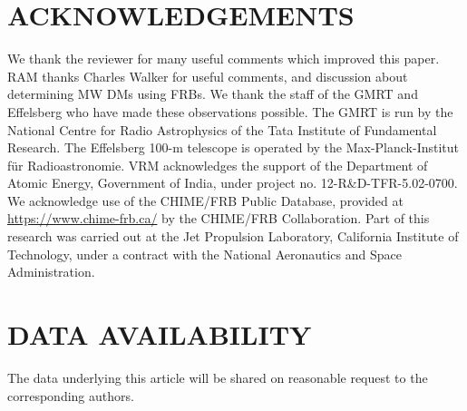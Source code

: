 \documentclass[fleqn,usenatbib]{mnras}
\begin{document}
\section{ACKNOWLEDGEMENTS}
We thank the reviewer for many useful comments which improved this paper. 
RAM thanks Charles Walker for useful comments, and discussion about determining MW DMs using FRBs.  We thank the staff of the GMRT and Effelsberg who have made these observations possible. The GMRT is run by the National Centre for Radio Astrophysics of the Tata Institute of Fundamental Research.  The Effelsberg 100-m telescope is operated by the Max-Planck-Institut f{\"u}r Radioastronomie.  VRM acknowledges the support of the Department of Atomic Energy, Government of India, under project no. 12-R\&D-TFR-5.02-0700. We acknowledge use of the CHIME/FRB Public Database, provided at \url{https://www.chime-frb.ca/} by the CHIME/FRB Collaboration. 
Part of this research was carried out at the Jet Propulsion Laboratory, California Institute of Technology, under a contract with the National Aeronautics and Space Administration.

\section{DATA AVAILABILITY}
The data underlying this article will be shared on reasonable request to the corresponding authors.



\end{document}
